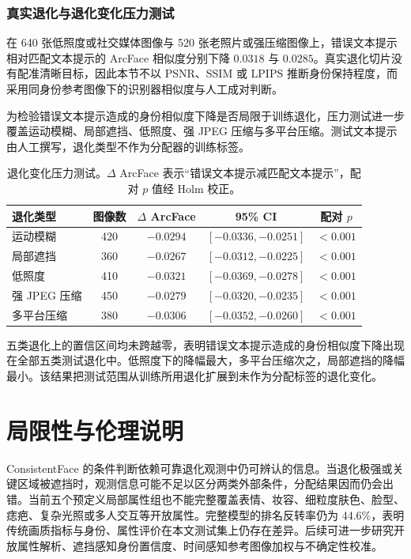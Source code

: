 \documentclass[journal]{IEEEtran}
\begin{document}
\subsubsection{真实退化与退化变化压力测试}
在 640 张低照度或社交媒体图像与 520 张老照片或强压缩图像上，错误文本提示相对匹配文本提示的 ArcFace 相似度分别下降 $0.0318$ 与 $0.0285$。真实退化切片没有配准清晰目标，因此本节不以 PSNR、SSIM 或 LPIPS 推断身份保持程度，而采用同身份参考图像下的识别器相似度与人工成对判断。

为检验错误文本提示造成的身份相似度下降是否局限于训练退化，压力测试进一步覆盖运动模糊、局部遮挡、低照度、强 JPEG 压缩与多平台压缩。测试文本提示由人工撰写，退化类型不作为分配器的训练标签。

\begin{table}[!t]
\centering
\caption{退化变化压力测试。$\Delta$ ArcFace 表示“错误文本提示减匹配文本提示”，配对 $p$ 值经 Holm 校正。}
\label{tab:ood_degradation}
\small
\setlength{\tabcolsep}{4pt}
\begin{tabular}{lcccc}
\toprule
退化类型 & 图像数 & $\Delta$ ArcFace & 95\% CI & 配对 $p$ \\
\midrule
运动模糊 & 420 & $-0.0294$ & $[-0.0336,-0.0251]$ & $<0.001$ \\
局部遮挡 & 360 & $-0.0267$ & $[-0.0312,-0.0225]$ & $<0.001$ \\
低照度 & 410 & $-0.0321$ & $[-0.0369,-0.0278]$ & $<0.001$ \\
强 JPEG 压缩 & 450 & $-0.0279$ & $[-0.0320,-0.0235]$ & $<0.001$ \\
多平台压缩 & 380 & $-0.0306$ & $[-0.0352,-0.0260]$ & $<0.001$ \\
\bottomrule
\end{tabular}
\end{table}

五类退化上的置信区间均未跨越零，表明错误文本提示造成的身份相似度下降出现在全部五类测试退化中。低照度下的降幅最大，多平台压缩次之，局部遮挡的降幅最小。该结果把测试范围从训练所用退化扩展到未作为分配标签的退化变化。

\section{局限性与伦理说明}
\label{sec:main_limitations}

ConsistentFace 的条件判断依赖可靠退化观测中仍可辨认的信息。当退化极强或关键区域被遮挡时，观测信息可能不足以区分两类外部条件，分配结果因而仍会出错。当前五个预定义局部属性组也不能完整覆盖表情、妆容、细粒度肤色、脸型、痣疤、复杂光照或多人交互等开放属性。完整模型的排名反转率仍为 44.6\%，表明传统画质指标与身份、属性评价在本文测试集上仍存在差异。后续可进一步研究开放属性解析、遮挡感知身份置信度、时间感知参考图像加权与不确定性校准。
\end{document}
